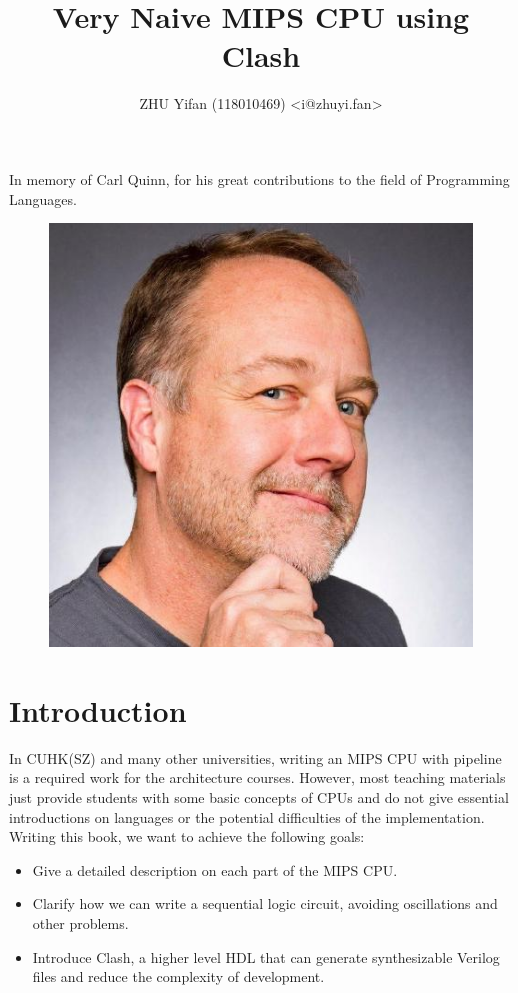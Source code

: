 \documentclass[a4paper,12pt, oneside]{book}
\title{Very Naive MIPS CPU using Clash}
\author{ZHU Yifan (118010469) <i@zhuyi.fan>}
\begin{document}
\frontmatter
\maketitle
\chapter*{}
\vspace*{\fill}
In memory of Carl Quinn, for his great contributions to the field of Programming Languages.
\begin{figure}[H]
	\centering
	\includegraphics[scale=0.8]{cquinn}
\end{figure}
\vspace*{\fill}
\chapter{Introduction}
In CUHK(SZ) and many other universities, writing an MIPS CPU with pipeline is a required work for the  architecture courses. However, most teaching materials just provide students with some basic concepts of CPUs and do not give essential introductions on languages or the potential difficulties of the implementation.
Writing this book, we want to achieve the following goals:
\begin{itemize}
	\item Give a detailed description on each part of the MIPS CPU.
	\item Clarify how we can write a sequential logic circuit, avoiding oscillations and other problems.  
	\item Introduce Clash, a higher level HDL that can generate synthesizable Verilog files and reduce the complexity of development. 
\end{itemize} 
\end{document}
